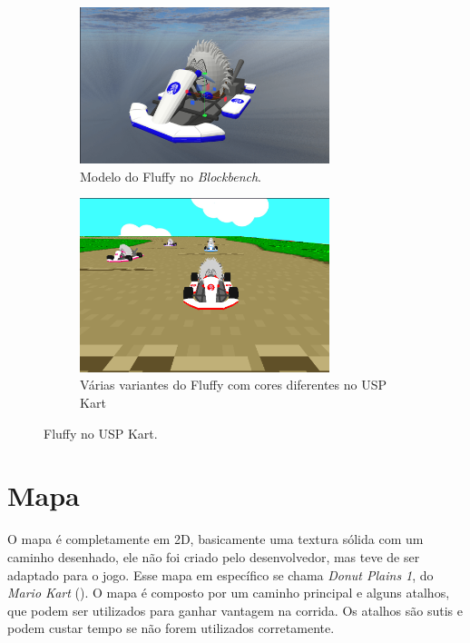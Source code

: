 \begin{figure}[H]
    \centering
    \begin{subfigure}[b]{1\textwidth}
        \centering
        \includegraphics[width=0.8\textwidth]{figuras/Fluffy.png}
        \caption{Modelo do Fluffy no \textit{Blockbench}.}
        \label{fig:fluffy-blockbench}
    \end{subfigure}
    \begin{subfigure}[b]{1\textwidth}
        \centering
        \includegraphics[width=0.8\textwidth]{figuras/USP Kart.png}
        \caption{Várias variantes do Fluffy com cores diferentes no USP Kart}
        \label{fig:fluffy-variantes}
    \end{subfigure}
    \caption{Fluffy no USP Kart.}
    \label{fig:fluffy}
\end{figure}

\section{Mapa}

O mapa é completamente em 2D, basicamente uma textura sólida com um caminho desenhado, ele não foi criado pelo desenvolvedor, mas teve de ser adaptado para o jogo. Esse mapa em específico se chama \textit{Donut Plains 1}, do \textit{Mario Kart} (\cite{marioKart}). O mapa é composto por um caminho principal e alguns atalhos, que podem ser utilizados para ganhar vantagem na corrida. Os atalhos são sutis e podem custar tempo se não forem utilizados corretamente.

